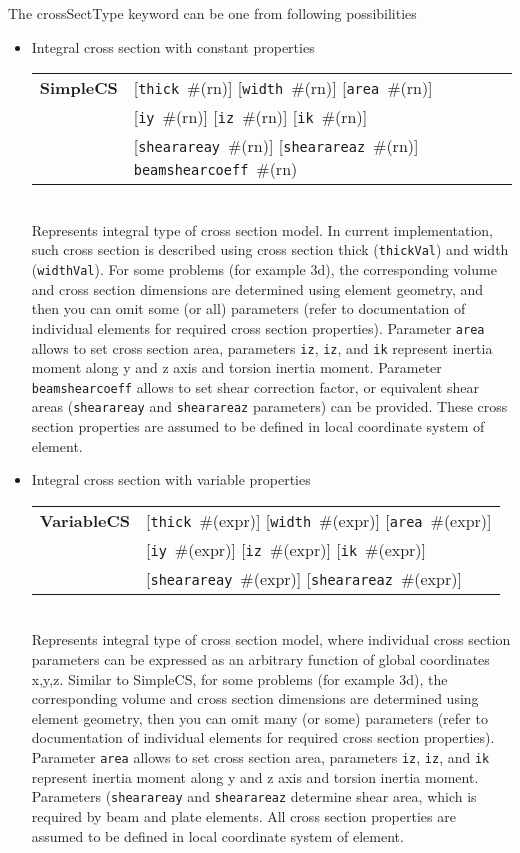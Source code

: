 \documentclass[a4paper]{article}
\newcommand{\param}[1]{\texttt{#1}} %
\newcommand{\optional}[1]{[#1]} %
\newcommand{\field}[2]{\param{#1}~\#{\tiny(#2)}} %
\newcommand{\optField}[2]{\optional{\field{#1}{#2}}}
\newcommand{\entKeywordInst}[1]{\textbf{#1}} %
\newenvironment{record}[1][]{\begin{tabular}{|ll}}{\end{tabular}\\}
\newcommand{\recentry}[2]{{#1}&{#2}\\}
\newcounter{rcc}
\newenvironment{record}[1][\textwidth]{\setcounter{rcc}{0}\rowcolors{1}{lightgray}{lightgray}\tabularx{#1}{llR} \hline}
               {\endtabularx}
\newcommand{\recentry}[2]{\ifthenelse{\value{rcc}>0}{$\backslash$ \\}{\setcounter{rcc}{1}}{#1}&{#2}&}
\begin{document}
The crossSectType keyword can be one from following possibilities
\begin{itemize}
\item 
Integral cross section with constant properties\\
\begin{record}[0.9\textwidth]
  \recentry{\entKeywordInst{SimpleCS}}{\optField{thick}{rn} \optField{width}{rn} \optField{area}{rn}}
  \recentry{}{\optField{iy}{rn} \optField{iz}{rn} \optField{ik}{rn}}
  \recentry{}{\optField{shearareay}{rn} \optField{shearareaz}{rn} \field{beamshearcoeff}{rn}}
\end{record}
Represents integral type of cross section model. In current
implementation, such cross section is described using cross section
thick (\param{thickVal}) and width (\param{widthVal}). For some
problems (for example 3d), the corresponding volume and cross section dimensions are
determined using element geometry, and then you can omit some (or all) parameters (refer to documentation of individual elements for required cross section properties). Parameter \param{area} allows to set cross section area, parameters \param{iz}, \param{iz}, and \param{ik} represent 
inertia moment along y and z axis and torsion inertia moment. Parameter \param{beamshearcoeff} allows to set shear correction factor, or equivalent 
shear areas (\param{shearareay} and \param{shearareaz} parameters) can be provided. 
These cross section properties are assumed to be defined in local coordinate system of element.\\

\item
Integral cross section with variable properties\\
\begin{record}[0.9\textwidth]
  \recentry{\entKeywordInst{VariableCS}}{\optField{thick}{expr} \optField{width}{expr} \optField{area}{expr}}
  \recentry{}{\optField{iy}{expr} \optField{iz}{expr} \optField{ik}{expr}}
  \recentry{}{\optField{shearareay}{expr} \optField{shearareaz}{expr} }
\end{record}
Represents integral type of cross section model, where individual cross section parameters can be expressed as an arbitrary function of global coordinates x,y,z. Similar to SimpleCS, for some problems (for example 3d), the corresponding volume and cross section dimensions are
determined using element geometry, then you can omit many (or some) parameters (refer to documentation of individual elements for required cross section properties). 
Parameter \param{area} allows to set cross section area, parameters \param{iz}, \param{iz}, and \param{ik} represent 
inertia moment along y and z axis and torsion inertia moment. Parameters (\param{shearareay} and \param{shearareaz} determine shear area, which is required by beam and plate elements. All cross section properties are assumed to be defined in local coordinate system of element.\\


\end{itemize}
\end{document}
